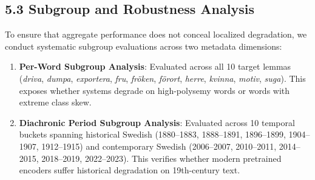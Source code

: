 \subsection{5.3 Subgroup and Robustness Analysis}
To ensure that aggregate performance does not conceal localized degradation, we conduct systematic subgroup evaluations across two metadata dimensions:
\begin{enumerate}
    \item \textbf{Per-Word Subgroup Analysis}: Evaluated across all 10 target lemmas (\textit{driva}, \textit{dumpa}, \textit{exportera}, \textit{fru}, \textit{fr\"oken}, \textit{f\"orort}, \textit{herre}, \textit{kvinna}, \textit{motiv}, \textit{suga}). This exposes whether systems degrade on high-polysemy words or words with extreme class skew.
    \item \textbf{Diachronic Period Subgroup Analysis}: Evaluated across 10 temporal buckets spanning historical Swedish (1880--1883, 1888--1891, 1896--1899, 1904--1907, 1912--1915) and contemporary Swedish (2006--2007, 2010--2011, 2014--2015, 2018--2019, 2022--2023). This verifies whether modern pretrained encoders suffer historical degradation on 19th-century text.
\end{enumerate}


